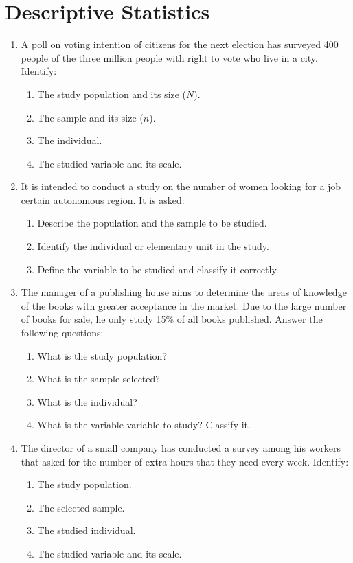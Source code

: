 
\section{Descriptive Statistics}
\begin{enumerate}[leftmargin=*]
\item A poll on voting intention of citizens for the next election has surveyed 400 people of the three million people with right
to vote who live in a city. Identify:
\begin{enumerate}
\item The study population and its size ($N$).
\item The sample and its size ($n$).
\item The individual.
\item The studied variable and its scale.
\end{enumerate}


\item It is intended to conduct a study on the number of women looking for a job certain autonomous region. It is asked:
\begin{enumerate}
\item Describe the population and the sample to be studied.
\item Identify the individual or elementary unit in the study.
\item Define the variable to be studied and classify it correctly.
\end{enumerate}


\item The manager of a publishing house aims to determine the areas of knowledge of the books with greater acceptance in the
market.
Due to the large number of books for sale, he only study 15\% of all books published. 
Answer the following questions:
\begin{enumerate}
\item What is the study population?
\item What is the sample selected?
\item What is the individual?
\item What is the variable variable to study? Classify it.
\end{enumerate}

\item The director of a small company has conducted a survey among his workers that asked for the number of extra hours that they
need every week. 
Identify: 
\begin{enumerate}
\item The study population.
\item The selected sample.
\item The studied individual.
\item The studied variable and its scale.
\end{enumerate}


\end{enumerate}
